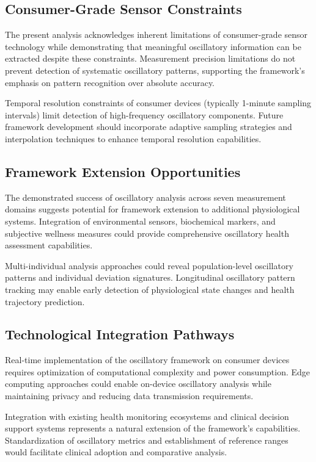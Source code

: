 \documentclass[12pt,a4paper]{article}
\theoremstyle{definition}
\begin{document}
\subsection{Consumer-Grade Sensor Constraints}

The present analysis acknowledges inherent limitations of consumer-grade sensor technology while demonstrating that meaningful oscillatory information can be extracted despite these constraints. Measurement precision limitations do not prevent detection of systematic oscillatory patterns, supporting the framework's emphasis on pattern recognition over absolute accuracy.

Temporal resolution constraints of consumer devices (typically 1-minute sampling intervals) limit detection of high-frequency oscillatory components. Future framework development should incorporate adaptive sampling strategies and interpolation techniques to enhance temporal resolution capabilities.

\subsection{Framework Extension Opportunities}

The demonstrated success of oscillatory analysis across seven measurement domains suggests potential for framework extension to additional physiological systems. Integration of environmental sensors, biochemical markers, and subjective wellness measures could provide comprehensive oscillatory health assessment capabilities.

Multi-individual analysis approaches could reveal population-level oscillatory patterns and individual deviation signatures. Longitudinal oscillatory pattern tracking may enable early detection of physiological state changes and health trajectory prediction.

\subsection{Technological Integration Pathways}

Real-time implementation of the oscillatory framework on consumer devices requires optimization of computational complexity and power consumption. Edge computing approaches could enable on-device oscillatory analysis while maintaining privacy and reducing data transmission requirements.

Integration with existing health monitoring ecosystems and clinical decision support systems represents a natural extension of the framework's capabilities. Standardization of oscillatory metrics and establishment of reference ranges would facilitate clinical adoption and comparative analysis.
\end{document}
